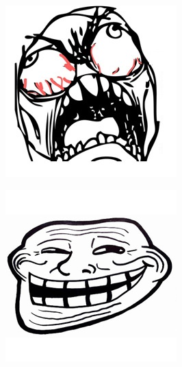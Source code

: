 \begin{multicols}{8}
\begin{center}
\includegraphics[width=\linewidth]{./IMG-GIT/MEMES/meme-face-cabreado.jpg}  
\end{center}

\end{multicols}

\vfill
\pagebreak

\begin{center}
	\includegraphics[height=\textheight]{./IMG-GIT/MEMES/meme-faces-troll.jpg}
\end{center}
